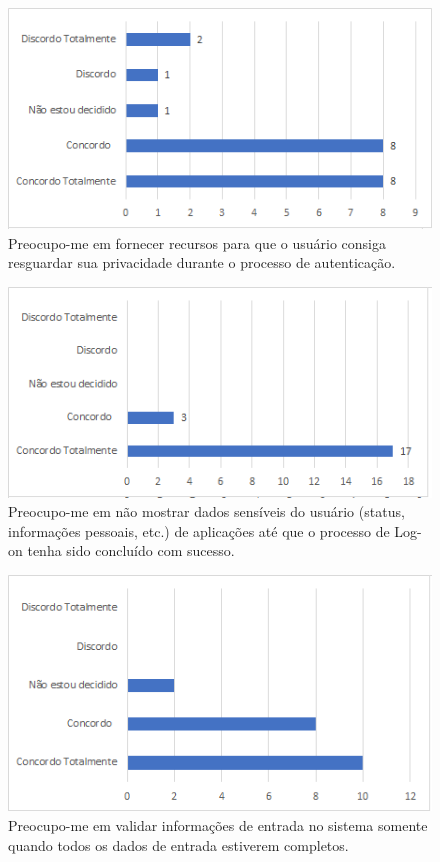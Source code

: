 \begin{figure}[!t]
\centering
\includegraphics[scale=0.7]{figuras das questoes/2.4.png}
\caption{Preocupo-me em fornecer recursos para que o usuário consiga resguardar sua privacidade durante o processo de autenticação.}
\end{figure}

\begin{figure}[!t]
\centering
\includegraphics[scale=0.7]{figuras das questoes/2.5.png}
\caption{Preocupo-me em não mostrar dados sensíveis do usuário (status, informações pessoais, etc.) de aplicações até que o processo de Log-on tenha sido concluído com sucesso.}
\end{figure}

\begin{figure}[!t]
\centering
\includegraphics[scale=0.7]{figuras das questoes/2.6.png}
\caption{Preocupo-me em validar informações de entrada no sistema somente quando todos os dados de entrada estiverem completos.}
\end{figure}

